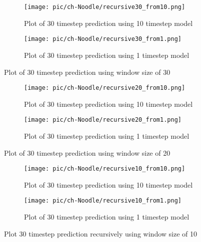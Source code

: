 \begin{figure}[t!]
\centering
\begin{subfigure}[b]{.45\textwidth}
  \centering
  \texttt{[image: pic/ch-Noodle/recursive30\_from10.png]}
  \caption{Plot of 30 timestep prediction using 10 timestep model}
  \label{fig:recursive30_10}
\end{subfigure}
%
\begin{subfigure}[b]{.47\textwidth}
  \centering
  \texttt{[image: pic/ch-Noodle/recursive30\_from1.png]}
  \caption{Plot of 30 timestep prediction using 1 timestep model}
  \label{fig:recursive30_1}
\end{subfigure}
\caption{Plot of 30 timestep prediction using window size of 30}
\label{fig:recursive30}
\end{figure}

\begin{figure}[t!]
\centering
\begin{subfigure}[b]{.45\textwidth}
  \centering
  \texttt{[image: pic/ch-Noodle/recursive20\_from10.png]}
  \caption{Plot of 30 timestep prediction using 10 timestep model}
  \label{fig:recursive20_10}
\end{subfigure}
%
\begin{subfigure}[b]{.47\textwidth}
  \centering
  \texttt{[image: pic/ch-Noodle/recursive20\_from1.png]}
  \caption{Plot of 30 timestep prediction using 1 timestep model}
  \label{fig:recursive20_1}
\end{subfigure}
\caption{Plot of 30 timestep prediction using window size of 20}
\label{fig:recursive20}
\end{figure}

\begin{figure}[t!]
\centering
\begin{subfigure}[b]{.45\textwidth}
  \centering
  \texttt{[image: pic/ch-Noodle/recursive10\_from10.png]}
  \caption{Plot of 30 timestep prediction using 10 timestep model}
  \label{fig:recursive10_10}
\end{subfigure}
%
\begin{subfigure}[b]{.48\textwidth}
  \centering
  \texttt{[image: pic/ch-Noodle/recursive10\_from1.png]}
  \caption{Plot of 30 timestep prediction using 1 timestep model}
  \label{fig:recursive10_1}
\end{subfigure}
\caption{Plot 30 timestep prediction recursively using window size of 10}
\label{fig:recursive10}
\end{figure}

